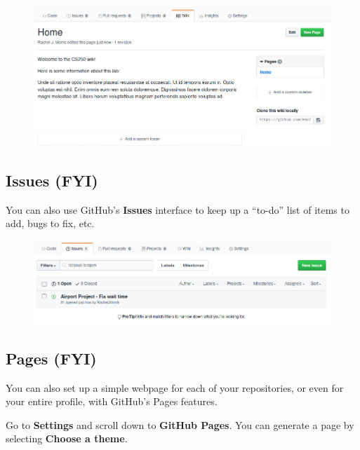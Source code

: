 \documentclass[a4paper,12pt,oneside]{book}
\begin{document}
        \begin{figure}[h]
            \centering
            \includegraphics[width=14cm]{images/github-wiki.png}
        \end{figure}

    \hrulefill

    \subsection{Issues (FYI)}

        You can also use GitHub's \textbf{Issues} interface to keep
        up a ``to-do'' list of items to add, bugs to fix, etc.

        \begin{figure}[h]
            \centering
            \includegraphics[width=14cm]{images/github-issues.png}
        \end{figure}

    \newpage

    \subsection{Pages (FYI)}

        You can also set up a simple webpage for each of your repositories,
        or even for your entire profile, with GitHub's Pages features.

        Go to \textbf{Settings} and scroll down to \textbf{GitHub Pages}.
        You can generate a page by selecting \textbf{Choose a theme}.
\end{document}
